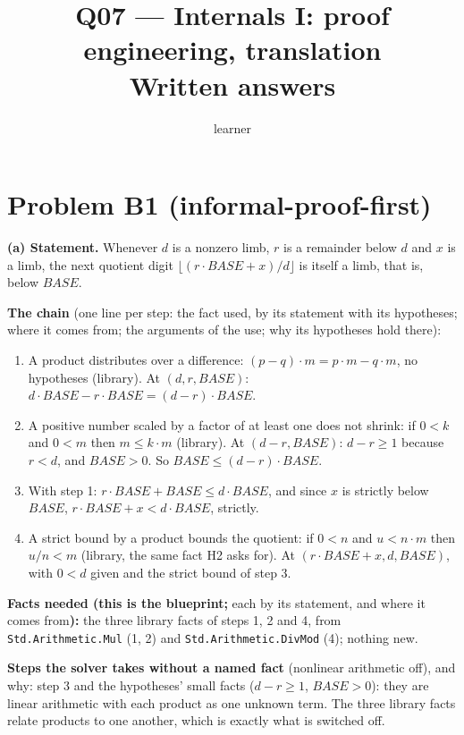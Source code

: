 \documentclass[11pt]{article}
\title{Q07 --- Internals I: proof engineering, translation \\ \large Written answers}
\author{learner}
\date{}
\begin{document}
\maketitle
\sloppy

\section*{Problem B1 (informal-proof-first)}\label{ans:B1}
\begin{answer}
\textbf{(a) Statement.} Whenever $d$ is a nonzero limb, $r$ is a remainder
below $d$ and $x$ is a limb, the next quotient digit
$\lfloor (r \cdot \mathit{BASE} + x) / d \rfloor$ is itself a limb, that is,
below $\mathit{BASE}$.

\textbf{The chain} (one line per step: the fact used, by its statement with
its hypotheses; where it comes from; the arguments of the use; why its
hypotheses hold there):
\begin{enumerate}
\item A product distributes over a difference:
  $(p - q) \cdot m = p \cdot m - q \cdot m$, no hypotheses (library). At
  $(d, r, \mathit{BASE})$: $d \cdot \mathit{BASE} - r \cdot \mathit{BASE} =
  (d - r) \cdot \mathit{BASE}$.
\item A positive number scaled by a factor of at least one does not shrink: if
  $0 < k$ and $0 < m$ then $m \leq k \cdot m$ (library). At
  $(d - r, \mathit{BASE})$: $d - r \geq 1$ because $r < d$, and
  $\mathit{BASE} > 0$. So $\mathit{BASE} \leq (d - r) \cdot \mathit{BASE}$.
\item With step 1: $r \cdot \mathit{BASE} + \mathit{BASE} \leq
  d \cdot \mathit{BASE}$, and since $x$ is strictly below $\mathit{BASE}$,
  $r \cdot \mathit{BASE} + x < d \cdot \mathit{BASE}$, strictly.
\item A strict bound by a product bounds the quotient: if $0 < n$ and
  $u < n \cdot m$ then $u / n < m$ (library, the same fact H2 asks for). At
  $(r \cdot \mathit{BASE} + x, d, \mathit{BASE})$, with $0 < d$ given and the
  strict bound of step 3.
\end{enumerate}

\textbf{Facts needed (this is the blueprint;} each by its statement, and
where it comes from\textbf{):} the three library facts of steps 1, 2 and 4,
from \texttt{Std.Arithmetic.Mul} (1, 2) and \texttt{Std.Arithmetic.DivMod}
(4); nothing new.

\textbf{Steps the solver takes without a named fact} (nonlinear arithmetic
off), and why: step 3 and the hypotheses' small facts ($d - r \geq 1$,
$\mathit{BASE} > 0$): they are linear arithmetic with each product as one
unknown term. The three library facts relate products to one another, which
is exactly what is switched off.


\end{answer}
\end{document}
